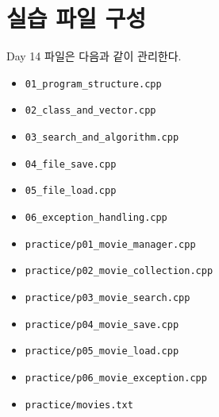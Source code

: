 \documentclass[11pt,a4paper]{article}
\begin{document}
\section{실습 파일 구성}
\begin{practicebox}
Day 14 파일은 다음과 같이 관리한다.
\begin{itemize}[leftmargin=1.5em]
    \item \texttt{01\_program\_structure.cpp}
    \item \texttt{02\_class\_and\_vector.cpp}
    \item \texttt{03\_search\_and\_algorithm.cpp}
    \item \texttt{04\_file\_save.cpp}
    \item \texttt{05\_file\_load.cpp}
    \item \texttt{06\_exception\_handling.cpp}
    \item \texttt{practice/p01\_movie\_manager.cpp}
    \item \texttt{practice/p02\_movie\_collection.cpp}
    \item \texttt{practice/p03\_movie\_search.cpp}
    \item \texttt{practice/p04\_movie\_save.cpp}
    \item \texttt{practice/p05\_movie\_load.cpp}
    \item \texttt{practice/p06\_movie\_exception.cpp}
    \item \texttt{practice/movies.txt}
\end{itemize}
\end{practicebox}
\end{document}
